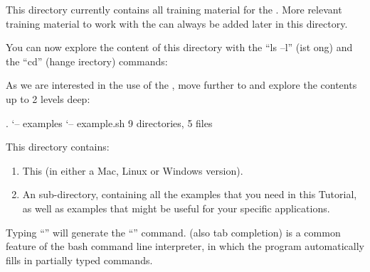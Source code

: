 This directory currently contains all training material for the .
More relevant training material to work with the \hpc can always be added
later in this directory.

You can now explore the content of this directory with the ``ls --l''
(ist ong) and the ``cd'' (hange
irectory) commands:

As we are interested in the use of the , move further to
 and explore the contents up to 2 levels deep:

\begin{prompt}
.
`-- examples
    `-- example.sh
9 directories, 5 files
\end{prompt}

This directory contains:

\begin{enumerate}
  \item This  (in either a Mac, Linux or Windows version).
  \item An  sub-directory, containing all the
    examples that you need in this Tutorial, as well as examples that might be
    useful for your specific applications.
\end{enumerate}

\begin{prompt}
\end{prompt}

\begin{tip}
Typing ``'' will generate the
``'' command. (also tab completion) is a common feature of the bash command line
interpreter, in which the program automatically fills in partially typed
commands.
\end{tip}

